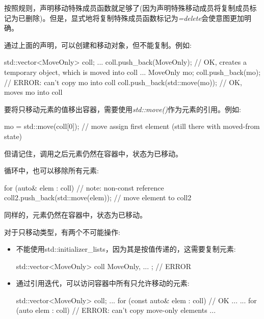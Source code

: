 按照规则，声明移动特殊成员函数就足够了(因为声明特殊移动成员将复制成员标记为已删除)。但是，显式地将复制特殊成员函数标记为\textit{=delete}会使意图更加明确。\par


通过上面的声明，可以创建和移动对象，但不能复制。例如:\par

\begin{codebox}[cpp]
std::vector<MoveOnly> coll;
...
coll.push_back(MoveOnly{}); // OK, creates a temporary object, which is moved into coll
...
MoveOnly mo;
coll.push_back(mo); // ERROR: can’t copy mo into coll
coll.push_back(std::move(mo)); // OK, moves mo into coll
\end{codebox}

要将只移动元素的值移出容器，需要使用\textit{std::move()}作为元素的引用。例如:\par

\begin{codebox}[cpp]
mo = std::move(coll[0]); // move assign first element (still there with moved-from state)
\end{codebox}

但请记住，调用之后元素仍然在容器中，状态为已移动。\par

循环中，也可以移除所有元素:\par

\begin{codebox}[cpp]
for (auto& elem : coll) { // note: non-const reference
  coll2.push_back(std::move(elem)); // move element to coll2
}
\end{codebox}

同样的，元素仍然在容器中，状态为已移动。\par

对于只移动类型，有两个不可能操作:\par

\begin{itemize}
  \item 不能使用std::initializer\_lists，因为其是按值传递的，这需要复制元素:
\begin{codebox}[cpp]
  std::vector<MoveOnly> coll{ MoveOnly{}, ... }; // ERROR
\end{codebox}
  \item 通过引用迭代，可以访问容器中所有只允许移动的元素:
\begin{codebox}[cpp]
  std::vector<MoveOnly> coll;
  ...
  for (const auto& elem : coll) { // OK
    ...
  }
  ...
  for (auto elem : coll) { // ERROR: can’t copy move-only elements
    ...
  }
\end{codebox}
\end{itemize}


